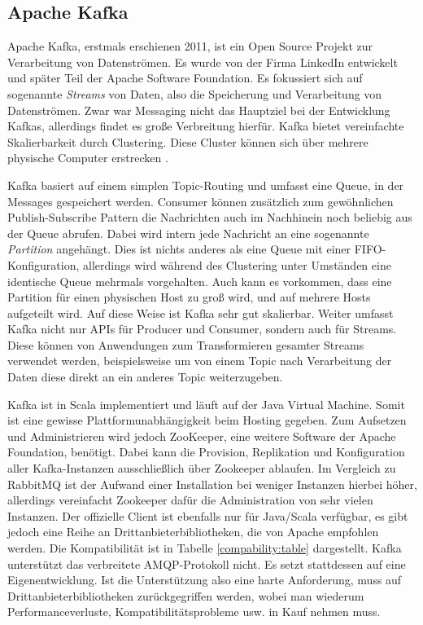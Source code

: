 \subsection{Apache Kafka}

Apache Kafka, erstmals erschienen 2011, ist ein Open Source Projekt zur Verarbeitung
von Datenströmen. Es wurde von der Firma LinkedIn entwickelt und später Teil der
Apache Software Foundation.
Es fokussiert sich auf sogenannte \textit{Streams} von Daten, also die Speicherung
und Verarbeitung von Datenströmen. Zwar war Messaging nicht das Hauptziel bei
der Entwicklung Kafkas, allerdings findet es große Verbreitung hierfür.
Kafka bietet vereinfachte Skalierbarkeit durch Clustering. Diese Cluster können sich
über mehrere physische Computer erstrecken \cite{ApacheKa84:online}.

Kafka basiert auf einem simplen Topic-Routing und umfasst
eine Queue, in der Messages gespeichert werden.
Consumer können zusätzlich zum gewöhnlichen Publish-Subscribe Pattern die Nachrichten
auch im Nachhinein noch beliebig aus der Queue abrufen.
Dabei wird intern jede Nachricht an eine sogenannte \textit{Partition} angehängt.
Dies ist nichts anderes als eine Queue mit einer FIFO-Konfiguration, allerdings
wird während des Clustering unter Umständen eine identische Queue mehrmals
vorgehalten. Auch kann es vorkommen, dass eine Partition für einen physischen
Host zu groß wird, und auf mehrere Hosts aufgeteilt wird.
Auf diese Weise ist Kafka sehr gut skalierbar.
Weiter umfasst Kafka nicht nur APIs für Producer und Consumer, sondern auch für
Streams. Diese können von Anwendungen zum Transformieren gesamter Streams verwendet
werden, beispielsweise um von einem Topic nach Verarbeitung der Daten diese direkt
an ein anderes Topic weiterzugeben. \cite{ApacheKa84:online}

Kafka ist in Scala implementiert und läuft auf der Java Virtual Machine. Somit
ist eine gewisse Plattformunabhängigkeit beim Hosting gegeben. Zum Aufsetzen und
Administrieren wird jedoch ZooKeeper, eine weitere Software der Apache Foundation,
benötigt. Dabei kann die Provision, Replikation und Konfiguration aller
Kafka-Instanzen ausschließlich über Zookeeper ablaufen. Im Vergleich zu RabbitMQ
ist der Aufwand einer Installation bei weniger Instanzen hierbei höher, allerdings
vereinfacht Zookeeper dafür die Administration von sehr vielen Instanzen.
Der offizielle Client ist ebenfalls nur für Java/Scala verfügbar, es
gibt jedoch eine Reihe an Drittanbieterbibliotheken, die von Apache empfohlen werden.
Die Kompatibilität ist in Tabelle \ref{compability:table} dargestellt.
Kafka unterstützt das verbreitete AMQP-Protokoll nicht. Es setzt stattdessen
auf eine Eigenentwicklung. Ist die Unterstützung also eine harte Anforderung,
muss auf Drittanbieterbibliotheken zurückgegriffen werden, wobei man wiederum
Performanceverluste, Kompatibilitätsprobleme usw. in Kauf nehmen muss. \cite{KafkaClients:online,ApacheKa84:online}

